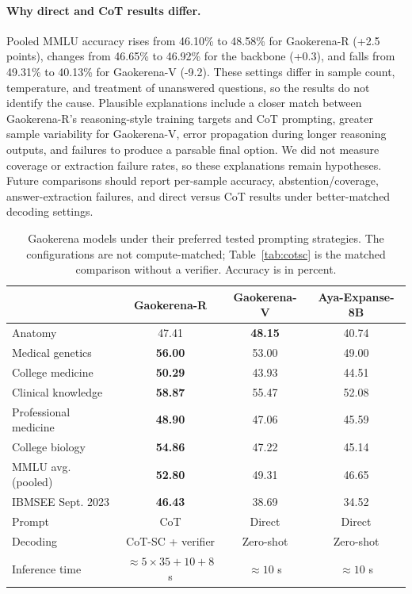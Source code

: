 \documentclass[manuscript,screen,review]{acmart}
\begin{document}
\paragraph{Why direct and CoT results differ.} Pooled MMLU accuracy rises from 46.10\% to 48.58\% for Gaokerena-R (+2.5 points), changes from 46.65\% to 46.92\% for the backbone (+0.3), and falls from 49.31\% to 40.13\% for Gaokerena-V (-9.2). These settings differ in sample count, temperature, and treatment of unanswered questions, so the results do not identify the cause. Plausible explanations include a closer match between Gaokerena-R's reasoning-style training targets and CoT prompting, greater sample variability for Gaokerena-V, error propagation during longer reasoning outputs, and failures to produce a parsable final option. We did not measure coverage or extraction failure rates, so these explanations remain hypotheses. Future comparisons should report per-sample accuracy, abstention/coverage, answer-extraction failures, and direct versus CoT results under better-matched decoding settings.

\begin{table}[ht]
\caption{Gaokerena models under their preferred tested prompting strategies. The configurations are not compute-matched; Table~\ref{tab:cotsc} is the matched comparison without a verifier. Accuracy is in percent.}\label{tab:med_opns_comparison}
\small
\begin{tabular*}{\textwidth}{@{\extracolsep\fill}lccc}
\toprule
 & Gaokerena-R & Gaokerena-V & Aya-Expanse-8B \\
\midrule
Anatomy & 47.41 & \textbf{48.15} & 40.74 \\
Medical genetics & \textbf{56.00} & 53.00 & 49.00 \\
College medicine & \textbf{50.29} & 43.93 & 44.51 \\
Clinical knowledge & \textbf{58.87} & 55.47 & 52.08 \\
Professional medicine & \textbf{48.90} & 47.06 & 45.59 \\
College biology & \textbf{54.86} & 47.22 & 45.14 \\
MMLU avg. (pooled) & \textbf{52.80} & 49.31 & 46.65 \\
IBMSEE Sept. 2023 & \textbf{46.43} & 38.69 & 34.52 \\
\midrule
Prompt & CoT & Direct & Direct \\
Decoding & CoT-SC + verifier & Zero-shot & Zero-shot \\
Inference time & $\approx5\times35+10+8$ s & $\approx10$ s & $\approx10$ s \\
\bottomrule
\end{tabular*}
\end{table}
\end{document}
